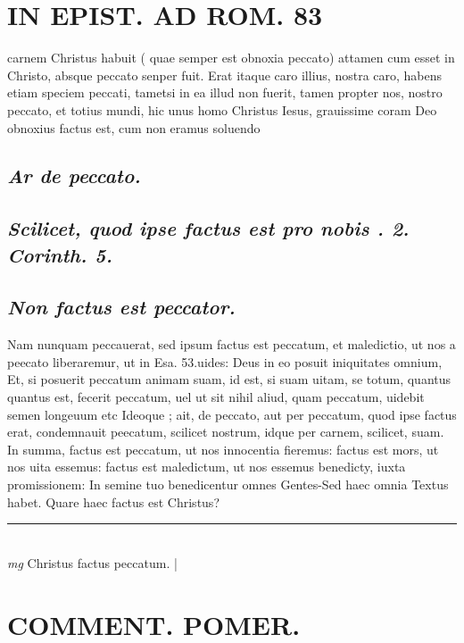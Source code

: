 \documentclass{article}
\begin{document}
\begin{pages}
\section*{IN EPIST. AD ROM.  83 }
\marginpar{[ p.]}\pstart carnem Christus habuit ( quae semper est obnoxia peccato) attamen cum esset in Christo, absque peccato senper fuit. Erat itaque caro illius, nostra caro, habens etiam speciem peccati, tametsi in ea illud non fuerit, tamen propter nos, nostro peccato, et totius mundi, hic unus homo Christus Iesus, grauissime coram Deo obnoxius factus est, cum non eramus soluendo\pend
{}
{}
\subsection*{\textit{Ar de peccato. }}
{}
\subsection*{\textit{Scilicet, quod ipse factus est pro nobis . 2. Corinth. 5.  }}
{}
\subsection*{\textit{Non factus est peccator. }}\pstart Nam nunquam peccauerat, sed ipsum factus est peccatum, et maledictio, ut nos a peecato liberaremur, ut in Esa. 53.uides: Deus in eo posuit iniquitates omnium, Et, si posuerit peccatum animam suam, id est, si suam uitam, se totum, quantus quantus est, fecerit peccatum, uel ut sit nihil aliud, quam peccatum, uidebit semen longeuum etc Ideoque ; ait, de peccato, aut per peccatum, quod ipse factus erat, condemnauit peecatum, scilicet nostrum, idque per carnem, scilicet, suam. In summa, factus est peccatum, ut nos innocentia fieremus: factus est mors, ut nos uita essemus: factus est maledictum, ut nos essemus benedicty, iuxta promissionem: In semine tuo benedicentur omnes Gentes-Sed haec omnia Textus habet. Quare haec factus est Christus?  \pend
\vspace{0.5cm}\noindent
\vspace{0.2cm}\rule{1cm}{0.2pt}\\ 
\hspace{0.2cm}\textit{mg}
\footnotesize Christus factus peccatum. 
\normalsize| 
\section*{COMMENT. POMER.  }
{}

\end{pages}
\end{document}
